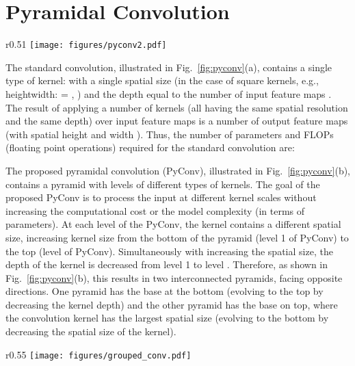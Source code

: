 \documentclass{article}
\begin{document}
\section{Pyramidal Convolution \label{section:pyconv}}

\begin{wrapfigure}{r}{0.51\textwidth}
\vspace{-0.5in}
  \centering
  \texttt{[image: figures/pyconv2.pdf]}
  \caption{(a) Standard conv; (b) Proposed PyConv.}
  \label{fig:pyconv}
  \vspace{-0.2in}
\end{wrapfigure}

The standard convolution, illustrated in Fig.~\ref{fig:pyconv}(a), contains a single type of kernel: with a single spatial size  (in the case of square kernels, e.g., heightwidth:  = ,   ) and the depth equal to the number of input feature maps . The result of applying a number of  kernels (all having the same spatial resolution and the same depth) over  input feature maps  is a number of  output feature maps (with spatial height  and width ). Thus, the number of parameters and FLOPs (floating point operations) required for the standard convolution are:   


The proposed pyramidal convolution (PyConv), illustrated in Fig.~\ref{fig:pyconv}(b), contains a pyramid with  levels of different types of kernels. The goal of the proposed PyConv is to process the input at different kernel scales without increasing the computational cost or the model complexity (in terms of parameters). At each level of the PyConv, the kernel contains a different spatial size, increasing kernel size from the bottom of the pyramid (level 1 of PyConv) to the top (level  of PyConv). Simultaneously with increasing the spatial size, the depth of the kernel is decreased from level 1 to level . Therefore, as shown in Fig.~\ref{fig:pyconv}(b), this results in two interconnected pyramids, facing opposite directions. One pyramid has the base at the bottom (evolving to the top by decreasing the kernel depth) and the other pyramid has the base on top, where the convolution kernel has the largest spatial size (evolving to the bottom by decreasing the spatial size of the kernel).
\begin{wrapfigure}{r}{0.55\textwidth}
\vspace{-0.1in}
  \centering
  \texttt{[image: figures/grouped\_conv.pdf]}
  \caption{Grouped Convolution.}
  \label{fig:grouped_conv}
\end{wrapfigure}
\end{document}
